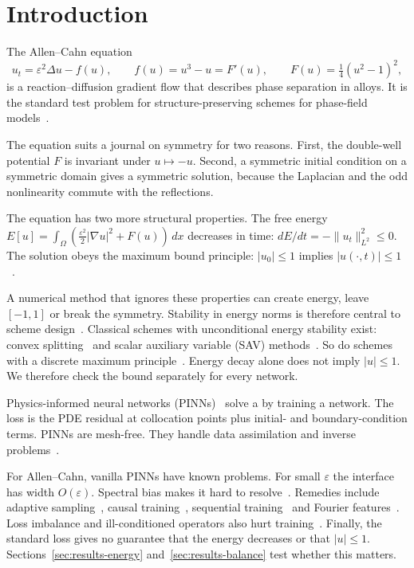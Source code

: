 \section{Introduction}

The Allen--Cahn equation~\cite{AllenCahn}
\begin{equation}\label{eq:AC-intro}
u_t = \varepsilon^2 \Delta u - f(u), \qquad f(u) = u^3-u = F'(u), \qquad F(u)=\tfrac14(u^2-1)^2,
\end{equation}
is a reaction--diffusion gradient flow that describes phase separation in alloys. It is the standard test problem for structure-preserving schemes for phase-field models~\cite{Du_review}.

The equation suits a journal on symmetry for two reasons. First, the double-well potential $F$ is invariant under $u\mapsto-u$. Second, a symmetric initial condition on a symmetric domain gives a symmetric solution, because the Laplacian and the odd nonlinearity commute with the reflections.

The equation has two more structural properties. The free energy $E[u]=\int_\Omega(\frac{\varepsilon^2}{2}|\nabla u|^2+F(u))\,dx$ decreases in time: $dE/dt=-\|u_t\|^2_{L^2}\le0$. The solution obeys the maximum bound principle: $|u_0|\le1$ implies $|u(\cdot,t)|\le1$~\cite{ref_Du2021b}.

A numerical method that ignores these properties can create energy, leave $[-1,1]$ or break the symmetry. Stability in energy norms is therefore central to scheme design~\cite{Baishemirov_Symmetry,Baigereyev_Math,Shiyapov2026}. Classical schemes with unconditional energy stability exist: convex splitting~\cite{Eyre} and scalar auxiliary variable (SAV) methods~\cite{Shen_SAV,Huang_GSAV,Jiang_RSAV}. So do schemes with a discrete maximum principle~\cite{ref_Tang2016,Zhang_ETD2024,Gao_pIFRK2023,Du_MPPDG2022,Feng_MPPFD2021,Kim_MPP3D2025}. Energy decay alone does not imply $|u|\le1$. We therefore check the bound separately for every network.

Physics-informed neural networks (PINNs)~\cite{Raissi} solve a  by training a network. The loss is the PDE residual at collocation points plus initial- and boundary-condition terms. PINNs are mesh-free. They handle data assimilation and inverse problems~\cite{Karniadakis2021,Yang_PINN,Lu_DeepXDE,Pateras2023}.

For Allen--Cahn, vanilla PINNs have known problems. For small $\varepsilon$ the interface has width $O(\varepsilon)$. Spectral bias makes it hard to resolve~\cite{Wight,ref_Rahaman2019,Wang_NTK2022}. Remedies include adaptive sampling~\cite{Wight}, causal training~\cite{Wang_causal}, sequential training~\cite{Mattey} and Fourier features~\cite{Liu_FourierBias2025}. Loss imbalance and ill-conditioned operators also hurt training~\cite{ref_Wang2021a,ref_Krishnapriyan2021,ref_Rathore2024}. Finally, the standard loss gives no guarantee that the energy decreases or that $|u|\le1$. Sections~\ref{sec:results-energy} and~\ref{sec:results-balance} test whether this matters.

